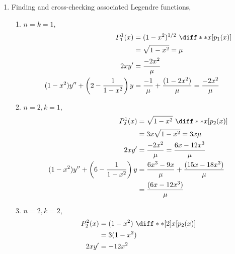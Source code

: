 \begin{enumerate}
    \item Finding and cross-checking associated Legendre functions,
          \begin{enumerate}
              \item $ n = k = 1 $,
                    \begin{align}
                        P_1^1 (x) & = (1 - x^2)^{1/2}\ \diff**{x}{\left[
                        p_1(x) \right]}                                       \\
                                  & = \sqrt{1 - x^2} = \mu                    \\
                        2xy'      & = \frac{-2x^2}{\mu}                       \\
                        (1 - x^2)y'' + \left( 2 - \frac{1}{1-x^2} \right)y
                                  & = \frac{-1}{\mu} + \frac{(1 - 2x^2)}{\mu}
                        = \frac{-2x^2}{\mu}
                    \end{align}
              \item $ n = 2, k = 1 $,
                    \begin{align}
                        P_2^1 (x) & = \sqrt{1 - x^2}\ \diff**{x}{\left[
                        p_2(x) \right]}                                            \\
                                  & = 3x \sqrt{1 - x^2} = 3x\mu                    \\
                        2xy'      & = \frac{-2x^2}{\mu}
                        = \frac{6x - 12x^3}{\mu}                                   \\
                        (1 - x^2)y'' + \left(6 - \frac{1}{1-x^2} \right)y
                                  & = \frac{6x^3 - 9x}{\mu} + \frac{(15x - 18x^3)}
                        {\mu}                                                      \\
                                  & = \frac{(6x - 12x^3)}{\mu}
                    \end{align}
              \item $ n = 2, k = 2 $,
                    \begin{align}
                        P_2^2 (x) & = (1 - x^2)\ \diff**[2]{x}{\left[
                        p_2(x) \right]}                               \\
                                  & = 3(1 - x^2)                      \\
                        2xy'      & = -12x^2                          \\

\end{align}
\end{enumerate}
\end{enumerate}
